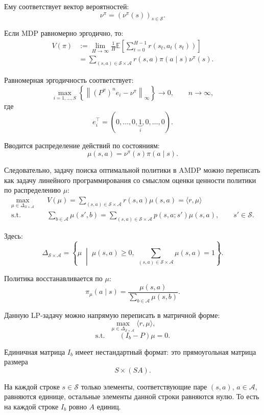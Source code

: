 \documentclass[12pt,a4paper]{article}
\begin{document}
Ему соответствует вектор вероятностей:
\[
\nu^\pi = \left(\nu^\pi(s)\right)_{s \in \mathcal S}.
\]

Если MDP равномерно эргодично, то:
\[
\begin{aligned}
V(\pi)
&:=
\lim_{H \to \infty}
\frac{1}{H}
\mathbb E
\left[
\sum_{t=0}^{H-1}
r(s_t,a_t(s_t))
\right]
\\
&=
\sum_{(s,a) \in \mathcal S \times \mathcal A}
r(s,a)\pi(a \mid s)\nu^\pi(s).
\end{aligned}
\]

Равномерная эргодичность соответствует:
\[
\max_{i=1,\ldots,S}
\left\{
\left\|
(P^\pi)^n e_i - \nu^\pi
\right\|_\infty
\right\}
\to 0,
\qquad
n \to \infty,
\]
где
\[
e_i^\top = (0,\ldots,0,\underbrace{1}_{i},0,\ldots,0).
\]

Вводится распределение действий по состояниям:
\[
\mu(s,a) = \nu^\pi(s)\pi(a \mid s).
\]

Следовательно, задачу поиска оптимальной политики в AMDP можно переписать как задачу линейного программирования со смыслом оценки ценности политики по распределению $\mu$:
\[
\begin{aligned}
\max_{\mu \in \Delta_{\mathcal S \times \mathcal A}}
\quad
&V(\mu)
=
\sum_{(s,a) \in \mathcal S \times \mathcal A}
r(s,a)\mu(s,a)
=
\langle r,\mu \rangle
\\
\text{s.t.}
\quad
&
\sum_{b \in \mathcal A}
\mu(s',b)
=
\sum_{(s,a) \in \mathcal S \times \mathcal A}
p(s,a;s')\mu(s,a),
\qquad
s' \in \mathcal S.
\end{aligned}
\]

Здесь:
\[
\Delta_{\mathcal S \times \mathcal A}
=
\left\{
\mu
\;\middle|\;
\mu(s,a) \ge 0,\;
\sum_{(s,a) \in \mathcal S \times \mathcal A}
\mu(s,a)=1
\right\}.
\]

Политика восстанавливается по $\mu$:
\[
\pi_\mu(a \mid s)
=
\frac{\mu(s,a)}
{\sum_{b \in \mathcal A}\mu(s,b)}.
\]

Данную LP-задачу можно напрямую переписать в матричной форме:
\[
\max_{\mu \in \Delta_{\mathcal S \times \mathcal A}}
\langle r,\mu \rangle,
\]
\[
\text{s.t.}
\qquad
(I_b - P)\mu = 0.
\]

Единичная матрица $I_b$ имеет нестандартный формат: это прямоугольная матрица размера
\[
S \times (SA).
\]

На каждой строке $s \in \mathcal S$ только элементы, соответствующие паре $(s,a)$, $a \in \mathcal A$, равняются единице, остальные элементы данной строки равняются нулю. То есть на каждой строке $I_b$ ровно $A$ единиц.
\end{document}
